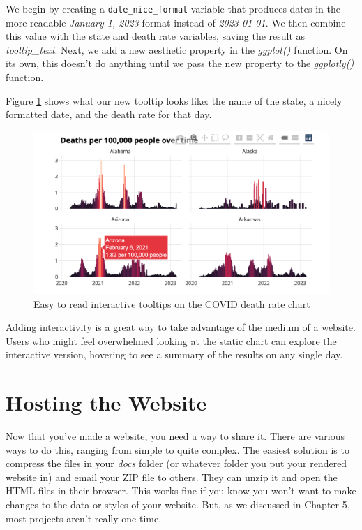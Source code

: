 \documentclass[
]{book}
\begin{document}
We begin by creating a \texttt{date\_nice\_format} variable that produces dates in the more readable \emph{January 1, 2023} format instead of \emph{2023-01-01}. We then combine this value with the state and death rate variables, saving the result as \emph{tooltip\_text}. Next, we add a new aesthetic property in the \emph{ggplot()} function. On its own, this doesn't do anything until we pass the new property to the \emph{ggplotly()} function.

Figure \ref{fig:covid-website-tooltip} shows what our new tooltip looks like: the name of the state, a nicely formatted date, and the death rate for that day.

\begin{figure}
\includegraphics[width=1\linewidth]{assets/covid-website-tooltip} \caption{Easy to read interactive tooltips on the COVID death rate chart}\label{fig:covid-website-tooltip}
\end{figure}

Adding interactivity is a great way to take advantage of the medium of a website. Users who might feel overwhelmed looking at the static chart can explore the interactive version, hovering to see a summary of the results on any single day.

\hypertarget{hosting-the-website}{%
\section*{Hosting the Website}\label{hosting-the-website}}

Now that you've made a website, you need a way to share it. There are various ways to do this, ranging from simple to quite complex. The easiest solution is to compress the files in your \emph{docs} folder (or whatever folder you put your rendered website in) and email your ZIP file to others. They can unzip it and open the HTML files in their browser. This works fine if you know you won't want to make changes to the data or styles of your website. But, as we discussed in Chapter 5, most projects aren't really one-time.
\end{document}
